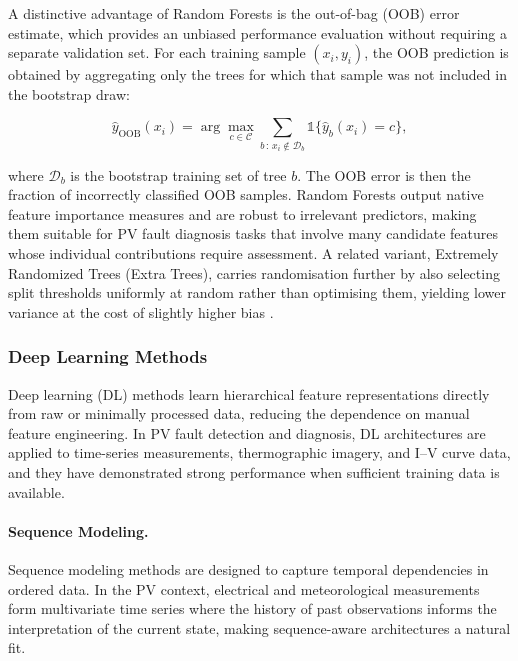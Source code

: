 A distinctive advantage of Random Forests is the out-of-bag (OOB) error estimate, which provides an unbiased performance evaluation without requiring a separate validation set. For each training sample $(x_i, y_i)$, the OOB prediction is obtained by aggregating only the trees for which that sample was not included in the bootstrap draw:

\begin{equation}
\hat{y}_{\text{OOB}}(x_i) = \arg\max_{c \in \mathcal{C}} \sum_{b \,:\, x_i \notin \mathcal{D}_b} \mathbb{1}\{\hat{y}_b(x_i) = c\},
\end{equation}

where $\mathcal{D}_b$ is the bootstrap training set of tree $b$. The OOB error is then the fraction of incorrectly classified OOB samples. Random Forests output native feature importance measures and are robust to irrelevant predictors, making them suitable for PV fault diagnosis tasks that involve many candidate features whose individual contributions require assessment. A related variant, Extremely Randomized Trees (Extra Trees), carries randomisation further by also selecting split thresholds uniformly at random rather than optimising them, yielding lower variance at the cost of slightly higher bias \citep{geurts2006extremely}.

\subsubsection{Deep Learning Methods}
\label{sec:offline-dl}

Deep learning (DL) methods learn hierarchical feature representations directly from raw or minimally processed data, reducing the dependence on manual feature engineering. In PV fault detection and diagnosis, DL architectures are applied to time-series measurements, thermographic imagery, and I--V curve data, and they have demonstrated strong performance when sufficient training data is available.

\paragraph{Sequence Modeling.}
Sequence modeling methods are designed to capture temporal dependencies in ordered data. In the PV context, electrical and meteorological measurements form multivariate time series where the history of past observations informs the interpretation of the current state, making sequence-aware architectures a natural fit.

